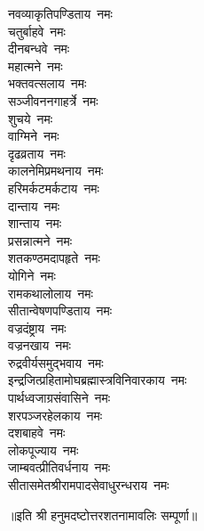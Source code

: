 \begin{multicols}{2}
\begin{flushleft}
नवव्याकृतिपण्डिताय~नमः\\
चतुर्बाहवे~नमः\\
दीनबन्धवे~नमः\\
महात्मने~नमः\\
भक्तवत्सलाय~नमः\\
सञ्जीवननगाहर्त्रे~नमः\\
शुचये~नमः\\
वाग्मिने~नमः\\
दृढव्रताय~नमः\\
कालनेमिप्रमथनाय~नमः\hfill{}\\
हरिमर्कटमर्कटाय~नमः\\
दान्ताय~नमः\\
शान्ताय~नमः\\
प्रसन्नात्मने~नमः\\
शतकण्ठमदापहृते~नमः\\
योगिने~नमः\\
रामकथालोलाय~नमः\\
सीतान्वेषणपण्डिताय~नमः\\
वज्रदंष्ट्राय~नमः\\
वज्रनखाय~नमः\hfill{}\\
रुद्रवीर्यसमुद्भवाय~नमः\\
इन्द्रजित्प्रहितामोघ\-ब्रह्मास्त्रविनिवारकाय~नमः\\
पार्थध्वजाग्रसंवासिने~नमः\\
शरपञ्जरहेलकाय~नमः\\
दशबाहवे~नमः\\
लोकपूज्याय~नमः\\
जाम्बवत्प्रीतिवर्धनाय~नमः\\
सीतासमेतश्रीराम\-पादसेवाधुरन्धराय~नमः\\
\end{flushleft}
\end{multicols}

\centerline{॥इति श्री हनुमदष्टोत्तरशतनामावलिः सम्पूर्णा॥}
